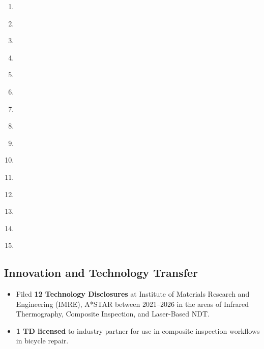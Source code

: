 \documentclass{my_cv}%
\begin{document}
\begin{enumerate}
\item \label{C26}  
\item \label{C27}  
\item \label{C28}  
\item \label{C29}  
\item \label{C30}  
\item \label{C31}  
\item \label{C32}  
\item \label{C33}  
\item \label{C34}  
\item \label{C35}  
\item \label{C36}  
\item \label{C37}  
\item \label{C38}  
\item \label{C39}  
\item \label{C40}  
\end{enumerate}

\subsection{\faLightbulbO \hspace{0.5em}\bfseries Innovation and Technology Transfer}

\begin{itemize}
\setlength\itemsep{-0.1em}
  \item Filed \textbf{12 Technology Disclosures} at Institute of Materials Research and Engineering (IMRE), A*STAR between 2021--2026 in the areas of Infrared Thermography, Composite Inspection, and Laser-Based NDT.
  \item \textbf{1 TD licensed} to industry partner for use in  composite inspection workflows in bicycle repair.
\end{itemize}
\end{document}
